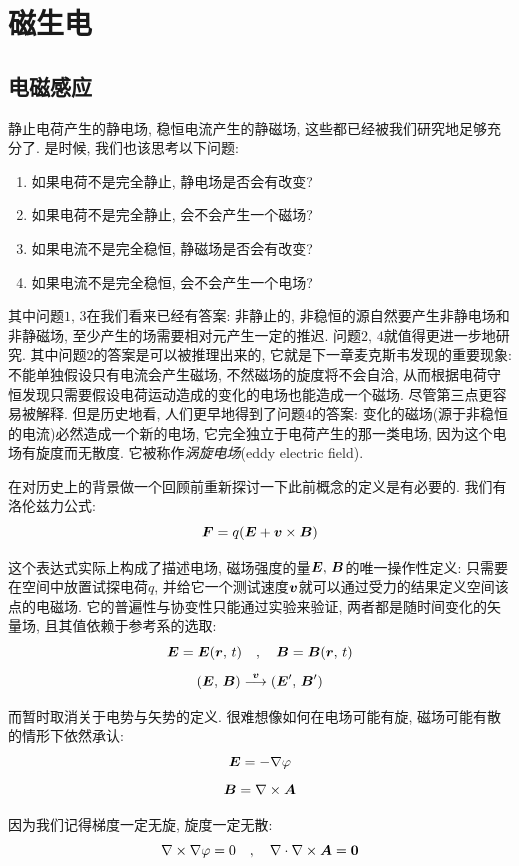 \chapter{磁生电}

\section{电磁感应}

静止电荷产生的静电场, 稳恒电流产生的静磁场, 这些都已经被我们研究地足够充分了. 是时候, 我们也该思考以下问题:
\begin{enumerate}
\item 如果电荷不是完全静止, 静电场是否会有改变?
\item 如果电荷不是完全静止, 会不会产生一个磁场?
\item 如果电流不是完全稳恒, 静磁场是否会有改变?
\item 如果电流不是完全稳恒, 会不会产生一个电场?
\end{enumerate}

其中问题$1,\,3$在我们看来已经有答案: 非静止的, 非稳恒的源自然要产生非静电场和非静磁场, 至少产生的场需要相对元产生一定的推迟. 问题$2,\,4$就值得更进一步地研究. 其中问题$2$的答案是可以被推理出来的, 它就是下一章麦克斯韦发现的重要现象: 不能单独假设只有电流会产生磁场, 不然磁场的旋度将不会自洽, 从而根据电荷守恒发现只需要假设电荷运动造成的变化的电场也能造成一个磁场. 尽管第三点更容易被解释. 但是历史地看, 人们更早地得到了问题$4$的答案: 变化的磁场(源于非稳恒的电流)必然造成一个新的电场, 它完全独立于电荷产生的那一类电场, 因为这个电场有旋度而无散度. 它被称作\emph{涡旋电场}(eddy electric field).

在对历史上的背景做一个回顾前重新探讨一下此前概念的定义是有必要的. 我们有洛伦兹力公式:
\[\boldsymbol{F}=q(\boldsymbol{E}+\boldsymbol{v}\times\boldsymbol{B})\]

这个表达式实际上构成了描述电场, 磁场强度的量$\boldsymbol{E},\,\boldsymbol{B}$的唯一操作性定义: 只需要在空间中放置试探电荷$q$, 并给它一个测试速度$\boldsymbol{v}$就可以通过受力的结果定义空间该点的电磁场. 它的普遍性与协变性只能通过实验来验证, 两者都是随时间变化的矢量场, 且其值依赖于参考系的选取:
\[\boldsymbol{E}=\boldsymbol{E}(\boldsymbol{r},\,t)\quad,\quad \boldsymbol{B}=\boldsymbol{B}(\boldsymbol{r},\,t)\]
\[(\boldsymbol{E},\,\boldsymbol{B})\overset{\boldsymbol{v}}{\longrightarrow}(\boldsymbol{E}',\,\boldsymbol{B}')\]

而暂时取消关于电势与矢势的定义. 很难想像如何在电场可能有旋, 磁场可能有散的情形下依然承认:
\[\boldsymbol{E}=-\nabla\varphi\]
\[\boldsymbol{B}=\nabla\times\boldsymbol{A}\]

因为我们记得梯度一定无旋, 旋度一定无散:
\[\nabla\times\nabla\varphi=0\quad ,\quad \nabla\cdot\nabla\times\boldsymbol{A}=\boldsymbol{0}\]


